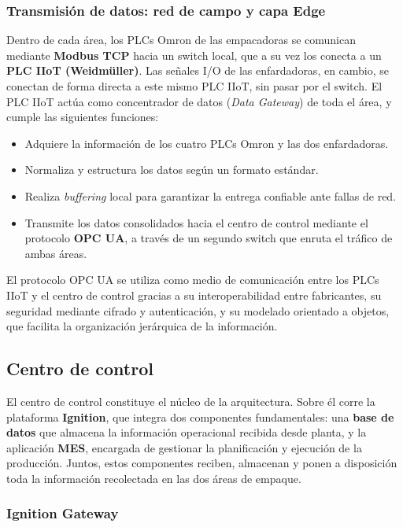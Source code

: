 \subsubsection{Transmisión de datos: red de campo y capa Edge}

Dentro de cada área, los PLCs Omron de las empacadoras se comunican mediante \textbf{Modbus TCP} hacia un switch local, que a su vez los conecta a un \textbf{PLC IIoT (Weidmüller)}. Las señales I/O de las enfardadoras, en cambio, se conectan de forma directa a este mismo PLC IIoT, sin pasar por el switch. El PLC IIoT actúa como concentrador de datos (\textit{Data Gateway}) de toda el área, y cumple las siguientes funciones:

\begin{itemize}
    \item Adquiere la información de los cuatro PLCs Omron y las dos enfardadoras.
    \item Normaliza y estructura los datos según un formato estándar.
    \item Realiza \textit{buffering} local para garantizar la entrega confiable ante fallas de red.
    \item Transmite los datos consolidados hacia el centro de control mediante el protocolo \textbf{OPC UA}, a través de un segundo switch que enruta el tráfico de ambas áreas.
\end{itemize}

El protocolo OPC UA se utiliza como medio de comunicación entre los PLCs IIoT y el centro de control gracias a su interoperabilidad entre fabricantes, su seguridad mediante cifrado y autenticación, y su modelado orientado a objetos, que facilita la organización jerárquica de la información.

\subsection{Centro de control}

El centro de control constituye el núcleo de la arquitectura. Sobre él corre la plataforma \textbf{Ignition}, que integra dos componentes fundamentales: una \textbf{base de datos} que almacena la información operacional recibida desde planta, y la aplicación \textbf{MES}, encargada de gestionar la planificación y ejecución de la producción. Juntos, estos componentes reciben, almacenan y ponen a disposición toda la información recolectada en las dos áreas de empaque.

\subsubsection{Ignition Gateway}

